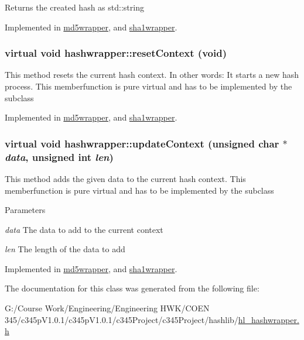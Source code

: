 \begin{DoxyReturn}{Returns}
the created hash as std::string 
\end{DoxyReturn}


Implemented in \hyperlink{classmd5wrapper_ab146103eb1283aaf0a83ae5e8101af26}{md5wrapper}, and \hyperlink{classsha1wrapper_a88f493c77f0655eb0b8e577226c49904}{sha1wrapper}.\hypertarget{classhashwrapper_aa7d46e9630a794ff08cfb5307660a86d}{
\subsubsection[{resetContext}]{\setlength{\rightskip}{0pt plus 5cm}virtual void hashwrapper::resetContext (void)}}
\label{classhashwrapper_aa7d46e9630a794ff08cfb5307660a86d}


This method resets the current hash context. In other words: It starts a new hash process. This memberfunction is pure virtual and has to be implemented by the subclass 

Implemented in \hyperlink{classmd5wrapper_a1e96064bfbb4156962d419f87ad684aa}{md5wrapper}, and \hyperlink{classsha1wrapper_a8ab1d20a43a4768df03799a14cfbb6b6}{sha1wrapper}.\hypertarget{classhashwrapper_a7fe42ccf310e7d2cfe95f61732b73197}{
\subsubsection[{updateContext}]{\setlength{\rightskip}{0pt plus 5cm}virtual void hashwrapper::updateContext (unsigned char $\ast$ {\em data}, \/  unsigned int {\em len})}}
\label{classhashwrapper_a7fe42ccf310e7d2cfe95f61732b73197}


This method adds the given data to the current hash context. This memberfunction is pure virtual and has to be implemented by the subclass


\begin{DoxyParams}{Parameters}
\item[{\em data}]The data to add to the current context \item[{\em len}]The length of the data to add \end{DoxyParams}


Implemented in \hyperlink{classmd5wrapper_a6ab84182cd32d43f5fd05bfb68bbc133}{md5wrapper}, and \hyperlink{classsha1wrapper_af862f411a597be53682cbce6177e06e6}{sha1wrapper}.

The documentation for this class was generated from the following file:\begin{DoxyCompactItemize}
\item 
G:/Course Work/Engineering/Engineering HWK/COEN 345/c345pV1.0.1/c345pV1.0.1/c345Project/c345Project/hashlib/\hyperlink{hl__hashwrapper_8h}{hl\_\-hashwrapper.h}\end{DoxyCompactItemize}
